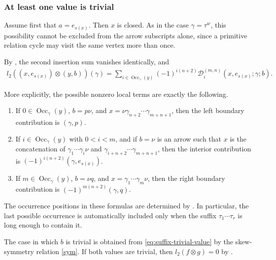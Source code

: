 \documentclass[11pt,a4paper,reqno]{amsart}
\newcommand{\mD}{\mathcal D}
\newcommand{\Occ}{\operatorname{Occ}}
\newcommand{\para}[2]{(#1,#2)}
\theoremstyle{plain}
\theoremstyle{definition}
\numberwithin{equation}{section}
\begin{document}
	\subsubsection{At least one value is trivial}
	
	Assume first that $a=e_{s(x)}$.
	Then $x$ is closed.  As in the case $\gamma=\tau^w$, this possibility
	cannot be excluded from the arrow subscripts alone, since a primitive relation
	cycle may visit the same vertex more than once.
	
	By , the second insertion sum vanishes
	identically, and
	\begin{align}
		l_2(
		\para{x}{e_{s(x)}}
		\otimes
		\para{y}{b}
		)(\gamma)
		=
		\sum_{i\in\Occ_\gamma(y)}
		(-1)^{i(n+2)}
		\mD_i^{(m,n)}
		(x,e_{s(x)};\gamma;b).
		\label{eq:suffix-trivial-value}
	\end{align}
	
	More explicitly, the possible nonzero local terms are exactly the following.
	
	\begin{enumerate}
		\item If $0\in\Occ_\gamma(y)$, $b=p\nu$, and
		$x=\nu\gamma_{n+2}\cdots\gamma_{m+n+1}$, then the left boundary
		contribution is $\para{\gamma}{p}$.
		
		\item If $i\in\Occ_\gamma(y)$ with $0<i<m$, and if $b=\nu$ is an
		arrow such that $x$ is the concatenation of
		$\gamma_1\cdots\gamma_i\nu$ and
		$\gamma_{i+n+2}\cdots\gamma_{m+n+1}$, then the interior contribution is
		$(-1)^{i(n+2)}\para{\gamma}{e_{s(x)}}$.
		
		\item If $m\in\Occ_\gamma(y)$, $b=\nu q$, and
		$x=\gamma_1\cdots\gamma_m\nu$, then the right boundary contribution is
		$(-1)^{m(n+2)}\para{\gamma}{q}$.
	\end{enumerate}
	
	The occurrence positions in these formulas are determined by
	.  In particular, the last possible occurrence
	is automatically included only when the suffix $\tau_1\cdots\tau_r$ is
	long enough to contain it.
	
	The case in which $b$ is trivial is obtained from
	\eqref{eq:suffix-trivial-value} by the skew-symmetry relation \eqref{sym}.
	If both values are trivial, then $l_2(f\otimes g)=0$ by
	.
	
\end{document}
